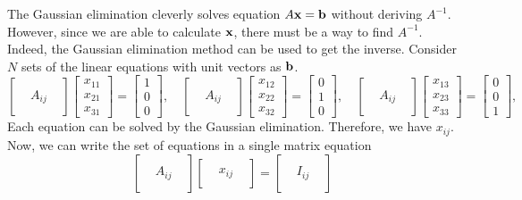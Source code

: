 The Gaussian elimination cleverly solves equation $A \vb{x} = \vb{b}$ without deriving $A^{-1}$. However, since we are able to calculate $\vb{x}$, there must be a way to find $A^{-1}$.
Indeed, the Gaussian elimination method can be used to get the inverse. Consider $N$ sets of the linear equations with unit vectors as $\vb{b}$.
\begin{equation}
\begin{bmatrix}  & & \\  & A_{ij} & \\  & &  \end{bmatrix}
\begin{bmatrix} x_{11} \\ x_{21} \\ x_{31} \end{bmatrix}
= \begin{bmatrix} 1\\ 0 \\ 0 \end{bmatrix}, \quad
\begin{bmatrix}  & & \\  & A_{ij} & \\  & &  \end{bmatrix}
\begin{bmatrix} x_{12} \\ x_{22} \\ x_{32} \end{bmatrix}
= \begin{bmatrix} 0 \\ 1\\ 0 \end{bmatrix}, \quad
\begin{bmatrix}  & & \\  & A_{ij} & \\  & &  \end{bmatrix}
\begin{bmatrix} x_{13} \\ x_{23} \\ x_{33} \end{bmatrix}
= \begin{bmatrix} 0 \\ 0 \\ 1 \end{bmatrix}, \quad
\end{equation}
Each equation can be solved by the Gaussian elimination.  Therefore, we have $x_{ij}$.  Now, we can write the set of equations in a single matrix equation
\begin{equation}\label{eq:gauss-jordin}
\begin{bmatrix}  & & \\  & A_{ij} & \\  & &  \end{bmatrix} 
\begin{bmatrix}  & & \\  & x_{ij} & \\  & &  \end{bmatrix} 
=
\begin{bmatrix}  & & \\  & I_{ij} & \\  & &  \end{bmatrix} 
\end{equation}
